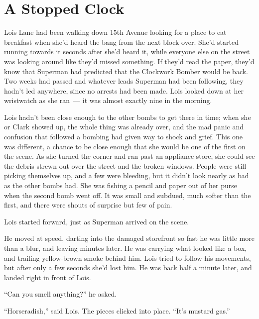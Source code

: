 \chapter{A Stopped Clock}\label{a-stopped-clock}

Lois Lane had been walking down 15th Avenue looking for a place to eat
breakfast when she'd heard the bang from the next block over. She'd
started running towards it seconds after she'd heard it, while everyone
else on the street was looking around like they'd missed something. If
they'd read the paper, they'd know that Superman had predicted that the
Clockwork Bomber would be back. Two weeks had passed and whatever leads
Superman had been following, they hadn't led anywhere, since no arrests
had been made. Lois looked down at her wristwatch as she ran~--- it was
almost exactly nine in the morning.

Lois hadn't been close enough to the other bombs to get there in time;
when she or Clark showed up, the whole thing was already over, and the
mad panic and confusion that followed a bombing had given way to shock
and grief. This one was different, a chance to be close enough that she
would be one of the first on the scene. As she turned the corner and ran
past an appliance store, she could see the debris strewn out over the
street and the broken windows. People were still picking themselves up,
and a few were bleeding, but it didn't look nearly as bad as the other
bombs had. She was fishing a pencil and paper out of her purse when the
second bomb went off. It was small and subdued, much softer than the
first, and there were shouts of surprise but few of pain.

Lois started forward, just as Superman arrived on the scene.

He moved at speed, darting into the damaged storefront so fast he was
little more than a blur, and leaving minutes later. He was carrying what
looked like a box, and trailing yellow‐brown smoke behind him. Lois
tried to follow his movements, but after only a few seconds she'd lost
him. He was back half a minute later, and landed right in front of Lois.

``Can you smell anything?'' he asked.

``Horseradish,'' said Lois. The pieces clicked into place. ``It's
mustard gas.''

